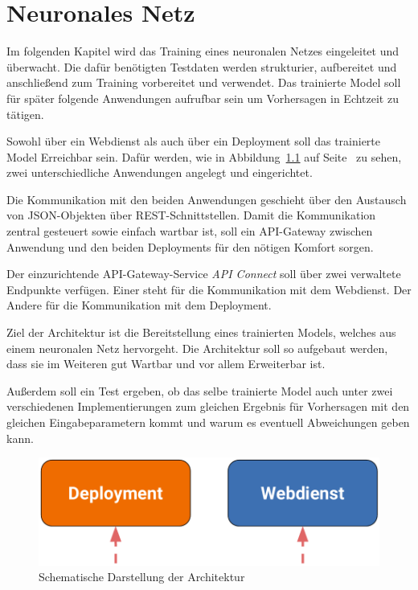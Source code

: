 \chapter{Neuronales Netz}
\label{ch:neuronalesNetz}
Im folgenden Kapitel wird das Training eines neuronalen Netzes eingeleitet und überwacht. Die dafür benötigten Testdaten
werden strukturier, aufbereitet und anschließend zum Training vorbereitet und verwendet. Das trainierte Model soll für
später folgende Anwendungen aufrufbar sein um Vorhersagen in Echtzeit zu tätigen.

Sowohl über ein Webdienst als auch über ein Deployment soll das trainierte Model Erreichbar sein. Dafür werden, wie in
Abbildung~\ref{fig:schematische_architektur} auf Seite~\pageref{fig:schematische_architektur} zu sehen, zwei
unterschiedliche Anwendungen angelegt und eingerichtet.

Die Kommunikation mit den beiden Anwendungen geschieht über den Austausch von JSON-Objekten über REST-Schnittstellen.
Damit die Kommunikation zentral gesteuert sowie einfach wartbar ist, soll ein API-Gateway zwischen Anwendung und den
beiden Deployments für den nötigen Komfort sorgen.

Der einzurichtende API-Gateway-Service \textit{API Connect} soll über zwei verwaltete Endpunkte verfügen. Einer steht
für die Kommunikation mit dem Webdienst. Der Andere für die Kommunikation mit dem Deployment.

Ziel der Architektur ist die Bereitstellung eines trainierten Models, welches aus einem neuronalen Netz hervorgeht. Die
Architektur soll so aufgebaut werden, dass sie im Weiteren gut Wartbar und vor allem Erweiterbar ist.

Außerdem soll ein Test ergeben, ob das selbe trainierte Model auch unter zwei verschiedenen Implementierungen zum
gleichen Ergebnis für Vorhersagen mit den gleichen Eingabeparametern kommt und warum es eventuell Abweichungen geben
kann.

\begin{figure}[h]
    \centering
    \includegraphics[scale=0.5]{images/kapitel_3/architektur_schematisch.pdf}
    \caption{Schematische Darstellung der Architektur}
    \label{fig:schematische_architektur}
\end{figure}